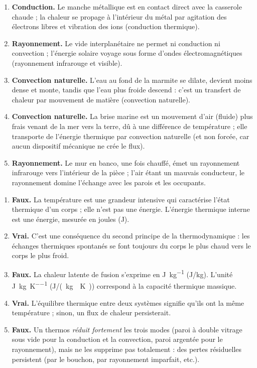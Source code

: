 \documentclass[11pt]{article}
\begin{document}
\begin{corrige}
\begin{enumerate}
\item \textbf{Conduction.} Le manche métallique est en contact direct avec la casserole chaude ; la chaleur se propage à l'intérieur du métal par agitation des électrons libres et vibration des ions (conduction thermique).
\item \textbf{Rayonnement.} Le vide interplanétaire ne permet ni conduction ni convection ; l'énergie solaire voyage sous forme d'ondes électromagnétiques (rayonnement infrarouge et visible).
\item \textbf{Convection naturelle.} L'eau au fond de la marmite se dilate, devient moins dense et monte, tandis que l'eau plus froide descend : c'est un transfert de chaleur par mouvement de matière (convection naturelle).
\item \textbf{Convection naturelle.} La brise marine est un mouvement d'air (fluide) plus frais venant de la mer vers la terre, dû à une différence de température ; elle transporte de l'énergie thermique par convection naturelle (et non forcée, car aucun dispositif mécanique ne crée le flux).
\item \textbf{Rayonnement.} Le mur en banco, une fois chauffé, émet un rayonnement infrarouge vers l'intérieur de la pièce ; l'air étant un mauvais conducteur, le rayonnement domine l'échange avec les parois et les occupants.
\end{enumerate}
\end{corrige}

\begin{corrige}
\begin{enumerate}
\item \textbf{Faux.} La température est une grandeur intensive qui caractérise l'état thermique d'un corps ; elle n'est pas une énergie. L'énergie thermique interne est une énergie, mesurée en joules (\si{\joule}).
\item \textbf{Vrai.} C'est une conséquence du second principe de la thermodynamique : les échanges thermiques spontanés se font toujours du corps le plus chaud vers le corps le plus froid.
\item \textbf{Faux.} La chaleur latente de fusion s'exprime en \si{\joule\per\kilogram} (\si{J/kg}). L'unité \si{\joule\per\kilogram\per\kelvin} (\si{J/(kg\cdot K)}) correspond à la capacité thermique massique.
\item \textbf{Vrai.} L'équilibre thermique entre deux systèmes signifie qu'ils ont la même température ; sinon, un flux de chaleur persisterait.
\item \textbf{Faux.} Un thermos \emph{réduit fortement} les trois modes (paroi à double vitrage sous vide pour la conduction et la convection, paroi argentée pour le rayonnement), mais ne les supprime pas totalement : des pertes résiduelles persistent (par le bouchon, par rayonnement imparfait, etc.).
\end{enumerate}
\end{corrige}
\end{document}
